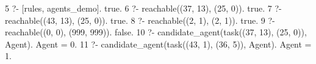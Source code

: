 5 ?- [rules, agents_demo].
true.
6 ?- reachable((37, 13), (25, 0)).
true.
7 ?- reachable((43, 13), (25, 0)).
true.
8 ?- reachable((2, 1), (2, 1)).
true.
9 ?- reachable((0, 0), (999, 999)).
false.
10 ?- candidate_agent(task((37, 13), (25, 0)), Agent).
Agent = 0.
11 ?- candidate_agent(task((43, 1), (36, 5)), Agent).
Agent = 1.